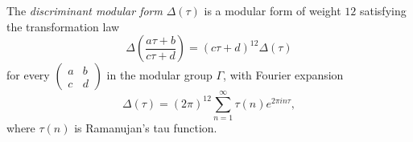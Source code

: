 The \textit{discriminant modular form} $\Delta(\tau)$ is a modular form of weight $12$ satisfying the transformation law
$$\Delta\left(\frac{a\tau + b}{c\tau + d}\right) = (c\tau + d)^{12} \Delta(\tau)$$
for every $\begin{pmatrix} a & b \\ c & d \end{pmatrix}$ in the modular group $\Gamma$, with Fourier expansion
$$\Delta(\tau) = (2\pi)^{12} \sum_{n=1}^{\infty} \tau(n) e^{2\pi i n \tau},$$
where $\tau(n)$ is Ramanujan's tau function.
